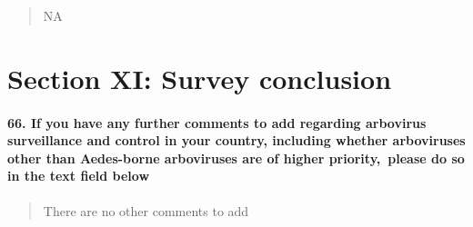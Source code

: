 \documentclass[
]{article}
\begin{document}
\begin{quote}
NA
\end{quote}

\hypertarget{section-xi-survey-conclusion}{%
\section{Section XI: Survey
conclusion}\label{section-xi-survey-conclusion}}

\hypertarget{if-you-have-any-further-comments-to-add-regarding-arbovirus-surveillance-and-control-in-your-country-including-whether-arboviruses-other-than-aedes-borne-arboviruses-are-of-higher-priority-please-do-so-in-the-text-field-below}{%
\paragraph{66. If you have any further comments to add regarding
arbovirus surveillance and control in your country, including whether
arboviruses other than Aedes-borne arboviruses are of higher
priority,~please do so in the text field
below}\label{if-you-have-any-further-comments-to-add-regarding-arbovirus-surveillance-and-control-in-your-country-including-whether-arboviruses-other-than-aedes-borne-arboviruses-are-of-higher-priority-please-do-so-in-the-text-field-below}}

\begin{quote}
There are no other comments to add
\end{quote}
\end{document}
